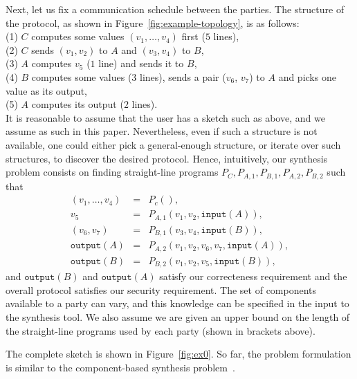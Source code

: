 \documentclass[preprint]{sig-alternate-05-2015}
\begin{document}
Next, let us fix a communication schedule between the parties.
The structure of the protocol, as shown in Figure~\ref{fig:example-topology},
is as follows:\\
(1) $C$ computes some values $(v_1, \ldots, v_4)$ first ($5$ lines), \\
(2) $C$ sends $(v_1, v_2)$ to $A$ and  $(v_3, v_4)$ to $B$,\\
(3) $A$ computes $v_5$ ($1$ line) and sends it to $B$,\\
(4) $B$ computes some values ($3$ lines), 
sends a pair ($v_6$, $v_7$) to $A$ and picks one value as its output, \\
(5) $A$ computes its output ($2$ lines).\\
It is reasonable to assume that the user has a sketch such as above,
and we assume as such in this paper.
Nevertheless, even if such a structure is not available, one could either
pick a general-enough structure, or
iterate over such structures, to discover the desired protocol.
Hence, intuitively, our synthesis problem consists on
finding straight-line programs
$P_C, P_{A,1}, P_{B,1}, P_{A,2}, P_{B,2}$ such that
\begin{eqnarray*}
  (v_1, \ldots, v_4) &=& P_c(),
\\
v_5 &=& P_{A,1}(v_1, v_2, \mathtt{input}(A)),
\\
(v_6, v_7) &=& P_{B,1}(v_3, v_4, \mathtt{input}(B)),
\\
\mathtt{output}(A) &=& P_{A,2}(v_1, v_2, v_6, v_7, \mathtt{input}(A)),
\\
\mathtt{output}(B) &=& P_{B,2}(v_1, v_2, v_5, \mathtt{input}(B)),
\end{eqnarray*}
and $\mathtt{output}(B)$ and $\mathtt{output}(A)$
satisfy our correcteness requirement and the overall
protocol satisfies our security requirement.
%
The set of components available to a party can vary, and this knowledge
can be specified in the input to the synthesis tool.  
We also assume we are given an upper
bound on the length of the straight-line programs
used by each party (shown in brackets above).   


The complete sketch is shown in Figure~\ref{fig:ex0}.
So far, the problem formulation
is similar to the component-based synthesis problem~\cite{bitvector}.
%
\end{document}
